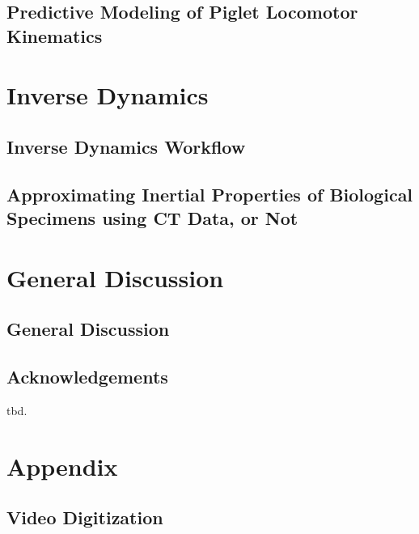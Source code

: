\documentclass[12pt,a4paper,twoside]{report}
\begin{document}
\chapter{Predictive Modeling of Piglet Locomotor Kinematics}\label{cpt:piglets}




\part{Inverse Dynamics}
% 

\chapter{Inverse Dynamics Workflow}\label{cpt:dynamics_workflow}


\chapter{Approximating Inertial Properties of Biological Specimens using CT Data, or Not}\label{cpt:inertials}




\part{General Discussion}
\chapter{General Discussion}\label{cpt:generaldiscussion}



\chapter{Acknowledgements}\label{acknowledgements}
tbd.





\part{Appendix}
\chapter{Video Digitization}\label{cpt:digitization}

\end{document}
